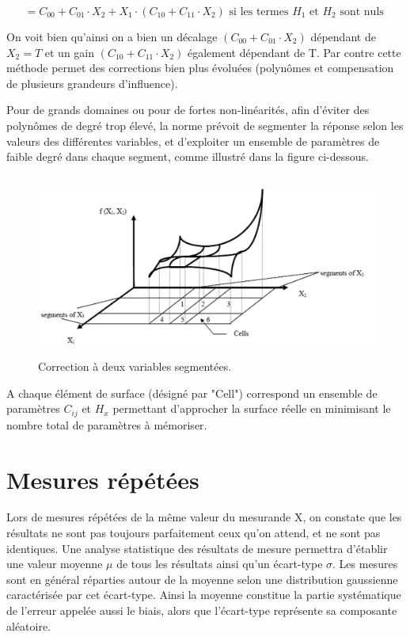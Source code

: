 \documentclass[main.tex]{subfiles}
\begin{document}
\begin{equation*}
    = C_{00} + C_{01} \cdot X_2 + X_1 \cdot (C_{10} + C_{11} \cdot X_2)  \text{ si les termes $H_1$ et $H_2$ sont nuls }
\end{equation*}

On voit bien qu'ainsi on a bien un décalage $(C_{00} + C_{01} \cdot X_2)$ dépendant de $X_2=T$ et un gain $(C_{10} + C_{11} \cdot X_2)$ également dépendant de T. Par contre cette méthode permet des corrections bien plus évoluées (polynômes et compensation de plusieurs grandeurs d'influence).

Pour de grands domaines ou pour de fortes non-linéarités, afin d'éviter des polynômes de degré trop élevé, la norme prévoit de segmenter la réponse selon les valeurs des différentes variables, et d'exploiter un ensemble de paramètres de faible degré dans chaque segment, comme illustré dans la figure ci-dessous.

\begin{figure}
    \centering
    \includegraphics[height=6cm]{assets/figures/3_6_Correction_a_2_variables_segementees.PNG}
    \caption{Correction à deux variables segmentées.}
    \label{fig:Correction_a_2_variables_segementees}
\end{figure}

A chaque élément de surface (désigné par "Cell") correspond un ensemble de paramètres $C_{ij}$ et $H_x$ permettant d'approcher la surface réelle en minimisant le nombre total de paramètres à mémoriser.

\section{Mesures répétées}

Lors de mesures répétées de la même valeur du mesurande X, on constate que les résultats ne sont pas toujours parfaitement ceux qu'on attend, et ne sont pas identiques. Une analyse statistique des résultats de mesure permettra d'établir une valeur moyenne $\mu$ de tous les résultats ainsi qu'un écart-type $\sigma$. Les mesures sont en général réparties autour de la moyenne selon une distribution gaussienne caractérisée par cet écart-type. Ainsi la moyenne constitue la partie systématique de l'erreur appelée aussi le biais, alors que l'écart-type représente sa composante aléatoire.
\end{document}
